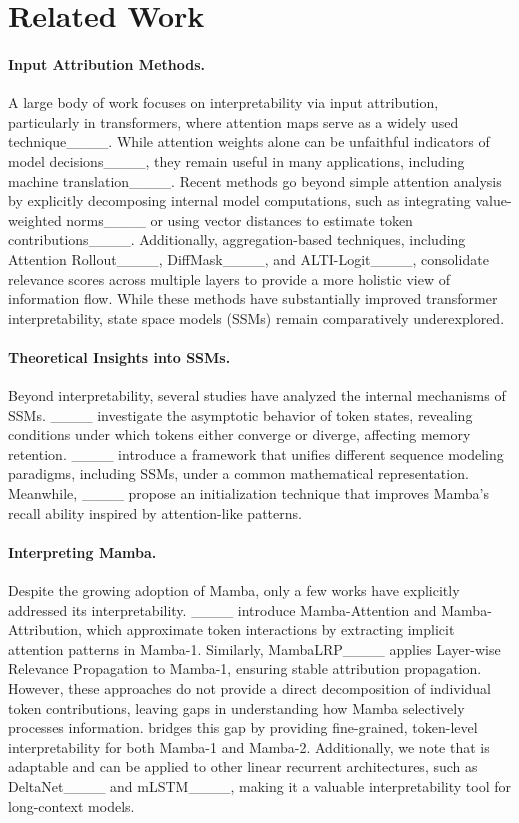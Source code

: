 \section{Related Work}
\paragraph{Input Attribution Methods.}
A large body of work focuses on interpretability via input attribution, particularly in transformers, where attention maps serve as a widely used technique____. While attention weights alone can be unfaithful indicators of model decisions____, they remain useful in many applications, including machine translation____. 
Recent methods go beyond simple attention analysis by explicitly decomposing internal model computations, such as integrating value-weighted norms____ or using vector distances to estimate token contributions____. 
Additionally, aggregation-based techniques, including Attention Rollout____, DiffMask____, and ALTI-Logit____, consolidate relevance scores across multiple layers to provide a more holistic view of information flow.
While these methods have substantially improved transformer interpretability, state space models (SSMs) remain comparatively underexplored.

\paragraph{Theoretical Insights into SSMs.}
Beyond interpretability, several studies have analyzed the internal mechanisms of SSMs. 
____ investigate the asymptotic behavior of token states, revealing conditions under which tokens either converge or diverge, affecting memory retention.
____ introduce a framework that unifies different sequence modeling paradigms, including SSMs, under a common mathematical representation.
Meanwhile, ____ propose an initialization technique that improves Mamba's recall ability inspired by attention-like patterns.


\paragraph{Interpreting Mamba.}
Despite the growing adoption of Mamba, only a few works have explicitly addressed its interpretability.
____ introduce Mamba-Attention and Mamba-Attribution, which approximate token interactions by extracting implicit attention patterns in Mamba-1.
Similarly, MambaLRP____ applies Layer-wise Relevance Propagation to Mamba-1, ensuring stable attribution propagation.
However, these approaches do not provide a direct decomposition of individual token contributions, leaving gaps in understanding how Mamba selectively processes information.
\methodname bridges this gap by providing fine-grained, token-level interpretability for both Mamba-1 and Mamba-2. Additionally, we note that \methodname is adaptable and can be applied to other linear recurrent architectures, such as DeltaNet____ and mLSTM____, making it a valuable interpretability tool for long-context models.





